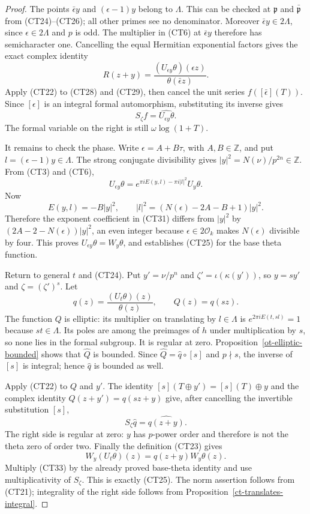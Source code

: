 \begin{proof}
The points $\bar\epsilon y$ and $(\epsilon-1)y$ belong to
$\Lambda$.  This can be checked at $\mathfrak p$ and
$\bar{\mathfrak p}$ from (CT24)--(CT26); all other primes
see no denominator.  Moreover $\bar\epsilon y\in2\Lambda$,
since $\epsilon\in2\Lambda$ and $p$ is odd.
The multiplier in (CT6) at $\bar\epsilon y$ therefore has
semicharacter one.  Cancelling the equal Hermitian exponential
factors gives the exact complex identity
\[
 R(z+y)=\frac{(U_{\epsilon y}\theta)(\epsilon z)}
                                      {\theta(\bar\epsilon z)}.
 \tag{CT29}
\]
Apply (CT22) to (CT28) and (CT29), then cancel the unit series
$f([\bar\epsilon](T))$.  Since $[\epsilon]$ is an integral
formal automorphism, substituting its inverse gives
\[
                      S_\zeta f=\widehat{U_{\epsilon y}\theta}.
 \tag{CT30}
\]
The formal variable on the right is still $\omega\log(1+T)$.

It remains to check the phase.  Write $\epsilon=A+B\tau$,
with $A,B\in\mathbb Z$, and put $l=(\epsilon-1)y\in\Lambda$.
The strong conjugate divisibility gives
$|y|^2=N(\nu)/p^{2n}\in\mathbb Z$.
From (CT3) and (CT6),
\[
 U_{\epsilon y}\theta
   =e^{\pi iE(y,l)-\pi i|l|^2}U_y\theta.
 \tag{CT31}
\]
Now
\[
 E(y,l)=-B|y|^2,\qquad
 |l|^2=(N(\epsilon)-2A-B+1)|y|^2.
\]
Therefore the exponent coefficient in (CT31) differs from
$|y|^2$ by
$(2A-2-N(\epsilon))|y|^2$, an even integer because
$\epsilon\in2\mathcal O_k$ makes $N(\epsilon)$ divisible
by four.  This proves
$U_{\epsilon y}\theta=W_y\theta$, and establishes (CT25)
for the base theta function.

Return to general $t$ and (CT24).  Put $y'=\nu/p^n$ and
$\zeta'=\iota(\kappa(y'))$, so $y=sy'$ and
$\zeta=(\zeta')^s$.  Let
\[
              q(z)=\frac{(U_t\theta)(z)}{\theta(z)},
                       \qquad Q(z)=q(sz).
 \tag{CT32}
\]
The function $Q$ is elliptic: its multiplier on translating by
$l\in\Lambda$ is $e^{2\pi iE(t,sl)}=1$ because
$st\in\Lambda$.  Its poles are among the preimages of $h$
under multiplication by $s$, so none lies in the formal subgroup.
It is regular at zero.  Proposition~\ref{ot-elliptic-bounded}
shows that $\widehat Q$ is bounded.  Since
$\widehat Q=\widehat q\circ[s]$ and $p\nmid s$, the inverse
of $[s]$ is integral; hence $\widehat q$ is bounded as well.

Apply (CT22) to $Q$ and $y'$.  The identity
$[s](T\mathbin\oplus y')=[s](T)\mathbin\oplus y$ and
the complex identity $Q(z+y')=q(sz+y)$ give, after cancelling
the invertible substitution $[s]$,
\[
                         S_\zeta\widehat q
                                     =\widehat{q(z+y)}.
 \tag{CT33}
\]
The right side is regular at zero: $y$ has $p$-power order and
therefore is not the theta zero of order two.
Finally the definition (CT23) gives
\[
                    W_y(U_t\theta)(z)=q(z+y)W_y\theta(z).
\]
Multiply (CT33) by the already proved base-theta identity and
use multiplicativity of $S_\zeta$.  This is exactly (CT25).
The norm assertion follows from (CT21); integrality of the
right side follows from Proposition~\ref{ct-translates-integral}.
\end{proof}

